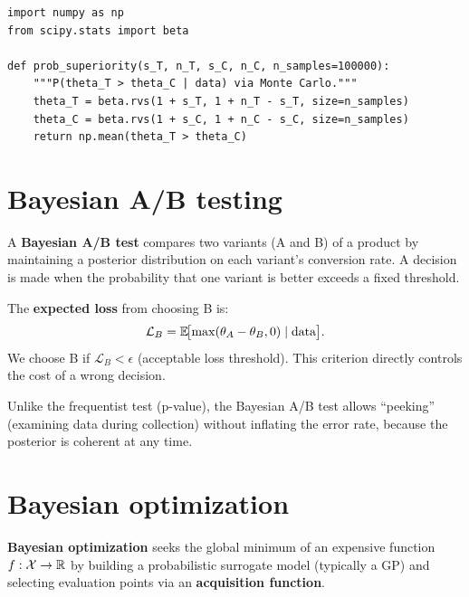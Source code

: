 \begin{verbatim}
import numpy as np
from scipy.stats import beta

def prob_superiority(s_T, n_T, s_C, n_C, n_samples=100000):
    """P(theta_T > theta_C | data) via Monte Carlo."""
    theta_T = beta.rvs(1 + s_T, 1 + n_T - s_T, size=n_samples)
    theta_C = beta.rvs(1 + s_C, 1 + n_C - s_C, size=n_samples)
    return np.mean(theta_T > theta_C)
\end{verbatim}

\section{Bayesian A/B testing}

\begin{definition}
A \textbf{Bayesian A/B test} compares two variants (A and B) of a product
by maintaining a posterior distribution on each variant's conversion rate.
A decision is made when the probability that one variant is better exceeds
a fixed threshold.
\end{definition}

\begin{proposition}
The \textbf{expected loss} from choosing B is:
\[
  \mathcal{L}_B = \mathbb{E}\!\bigl[\max(\theta_A - \theta_B, 0) \mid \text{data}\bigr].
\]
We choose B if $\mathcal{L}_B < \epsilon$ (acceptable loss threshold).
This criterion directly controls the cost of a wrong decision.
\end{proposition}

\begin{attention}
Unlike the frequentist test (p-value), the Bayesian A/B test allows
``peeking'' (examining data during collection) without inflating the error
rate, because the posterior is coherent at any time.
\end{attention}

\section{Bayesian optimization}

\begin{definition}
\textbf{Bayesian optimization} seeks the global minimum of an expensive
function $f : \mathcal{X} \to \mathbb{R}$ by building a probabilistic surrogate
model (typically a GP) and selecting evaluation points via an
\textbf{acquisition function}.
\end{definition}

